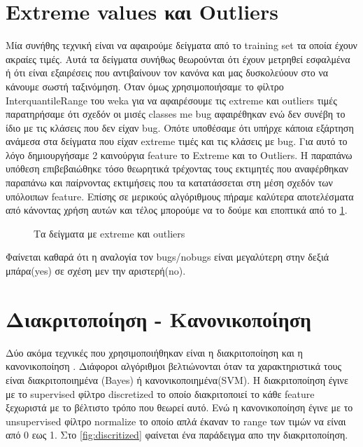 \section { Extreme values και Outliers }
Μία συνήθης τεχνική είναι να αφαιρούμε δείγματα από το training set τα οποία έχουν ακραίες τιμές.
Αυτά τα δείγματα συνήθως θεωρούνται ότι έχουν μετρηθεί εσφαλμένα ή ότι είναι εξαιρέσεις που αντιβαίνουν τον κανόνα και μας δυσκολεύουν στο να κάνουμε σωστή ταξινόμηση.
Όταν όμως χρησιμοποιήσαμε το φίλτρο ΙnterquantileRange του weka για να αφαιρέσουμε τις extreme και outliers τιμές παρατηρήσαμε ότι σχεδόν οι μισές classes me bug αφαιρέθηκαν ενώ δεν συνέβη το ίδιο με τις κλάσεις που δεν είχαν bug.
Οπότε υποθέσαμε ότι υπήρχε κάποια εξάρτηση ανάμεσα στα δείγματα που είχαν extreme τιμές και τις κλάσεις με bug.
Για αυτό το λόγο δημιουργήσαμε 2 καινούργια feature το Extreme και το Outliers.
Η παραπάνω υπόθεση επιβεβαιώθηκε τόσο θεωρητικά τρέχοντας τους εκτιμητές που αναφέρθηκαν παραπάνω και παίρνοντας εκτιμήσεις που τα κατατάσσεται στη μέση σχεδόν των υπόλοιπων feature. Επίσης σε μερικούς αλγόριθμους πήραμε καλύτερα αποτελέσματα από κάνοντας χρήση αυτών και τέλος μπορούμε να το δούμε και εποπτικά από το
\hyperref[fig:extreme-outlier]{\figurename{} \ref{fig:extreme-outlier}}.
\begin{figure}[ht]
    \caption{Τα δείγματα με extreme και outliers}
    \label{fig:extreme-outlier}
\end{figure}

Φαίνεται καθαρά ότι η αναλογία τον bugs/nobugs είναι μεγαλύτερη στην δεξιά μπάρα(yes) σε σχέση μεν την αριστερή(no).

\section { Διακριτοποίηση - Κανονικοποίηση  }
Δύο ακόμα τεχνικές που χρησιμοποιήθηκαν είναι η διακριτοποίηση και η κανονικοποίηση .
Διάφοροι αλγόριθμοι βελτιώνονται όταν τα χαρακτηριστικά τους είναι διακριτοποιημένα (Bayes) ή κανονικοποιημένα(SVM).
H διακριτοποίηση έγινε με το supervised φίλτρο discretized το οποίο διακριτοποιεί το κάθε feature ξεχωριστά με το βέλτιστο τρόπο που θεωρεί αυτό.
Ενώ η κανονικοποίηση έγινε με το unsupervised φίλτρο normalize το οποίο απλά έκαναν το range των τιμών να είναι από 0 εως 1.
Στο 
\hyperref[fig:discritized]{\figurename{} \ref{fig:discritized}}
φαίνεται ένα παράδειγμα απο την διακριτοποίηση.
 
